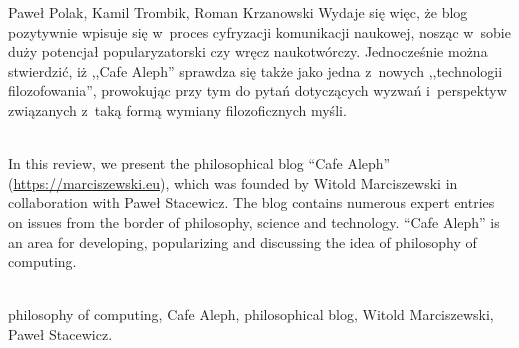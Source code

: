 \begin{newrevplenv}{Paweł Polak, Kamil Trombik, Roman Krzanowski}
Wydaje się więc, że blog pozytywnie wpisuje się w~proces cyfryzacji komunikacji naukowej, nosząc w~sobie duży potencjał popularyzatorski czy wręcz naukotwórczy. Jednocześnie można stwierdzić, iż ,,Cafe Aleph'' sprawdza się także jako jedna z~nowych ,,technologii filozofowania'', prowokując przy tym do pytań dotyczących wyzwań i~perspektyw związanych z~taką formą wymiany filozoficznych myśli.




\vspace{5mm}%
\begin{flushright}
{\chaptitleeng\color{black!50}{Internet clothes of the philosophy in the information technology era}}
\end{flushright}

{}\\
{In this review, we present the philosophical blog ``Cafe Aleph'' (\url{https://marciszewski.eu}), which was founded by Witold Marciszewski in collaboration with Paweł Stacewicz. The blog contains numerous expert entries on issues from the border of philosophy, science and technology. ``Cafe Aleph'' is an area for developing, popularizing and discussing the idea of philosophy of computing.}\par%
\vspace{2mm}%
{}\\%
{philosophy of computing, Cafe Aleph, philosophical blog, Witold Marciszewski, Paweł Stacewicz.}%


\end{newrevplenv}